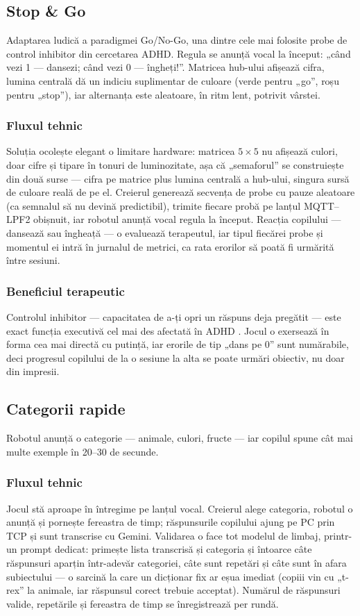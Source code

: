 \subsection{Stop \& Go}

Adaptarea ludică a paradigmei Go/No-Go, una dintre cele mai folosite probe de control inhibitor din cercetarea ADHD. Regula se anunță vocal la început: „când vezi 1 — dansezi; când vezi 0 — îngheți!”. Matricea hub-ului afișează cifra, lumina centrală dă un indiciu suplimentar de culoare (verde pentru „go”, roșu pentru „stop”), iar alternanța este aleatoare, în ritm lent, potrivit vârstei.

\subsubsection*{Fluxul tehnic}
Soluția ocolește elegant o limitare hardware: matricea $5\times5$ nu afișează culori, doar cifre și tipare în tonuri de luminozitate, așa că „semaforul” se construiește din două surse — cifra pe matrice plus lumina centrală a hub-ului, singura sursă de culoare reală de pe el. Creierul generează secvența de probe cu pauze aleatoare (ca semnalul să nu devină predictibil), trimite fiecare probă pe lanțul MQTT--LPF2 obișnuit, iar robotul anunță vocal regula la început. Reacția copilului — dansează sau îngheață — o evaluează terapeutul, iar tipul fiecărei probe și momentul ei intră în jurnalul de metrici, ca rata erorilor să poată fi urmărită între sesiuni.

\subsubsection*{Beneficiul terapeutic}
Controlul inhibitor — capacitatea de a-ți opri un răspuns deja pregătit — este exact funcția executivă cel mai des afectată în ADHD \cite{diamond2013}. Jocul o exersează în forma cea mai directă cu putință, iar erorile de tip „dans pe 0” sunt numărabile, deci progresul copilului de la o sesiune la alta se poate urmări obiectiv, nu doar din impresii.

\subsection{Categorii rapide}

Robotul anunță o categorie — animale, culori, fructe — iar copilul spune cât mai multe exemple în 20--30 de secunde.

\subsubsection*{Fluxul tehnic}
Jocul stă aproape în întregime pe lanțul vocal. Creierul alege categoria, robotul o anunță și pornește fereastra de timp; răspunsurile copilului ajung pe PC prin TCP și sunt transcrise cu Gemini. Validarea o face tot modelul de limbaj, printr-un prompt dedicat: primește lista transcrisă și categoria și întoarce câte răspunsuri aparțin într-adevăr categoriei, câte sunt repetări și câte sunt în afara subiectului — o sarcină la care un dicționar fix ar eșua imediat (copiii vin cu „t-rex” la animale, iar răspunsul corect trebuie acceptat). Numărul de răspunsuri valide, repetările și fereastra de timp se înregistrează per rundă.

